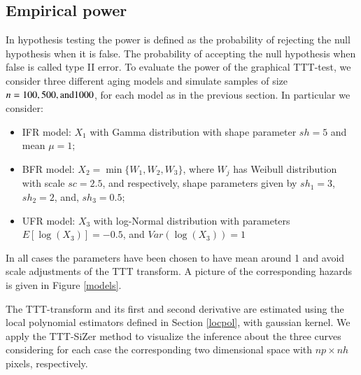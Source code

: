\documentclass[preprint,12pt]{elsarticle}
\begin{document}
\subsection{Empirical power}

In hypothesis testing the power is defined as the probability of rejecting the null hypothesis when it is false. The probability of accepting the null hypothesis when false is called type II error. To evaluate the power of the graphical TTT-test, we consider three  different aging models and  simulate samples of size $n = 100, 500, {\rm and} 1000$, for each model as in the previous section.  In particular we consider:
\begin{itemize}
\item IFR model: $X_1$ with Gamma distribution with shape parameter $sh=5$ and mean $\mu=1$;
\item BFR model: $X_2= \min\{W_1, W_2, W_3\}$, where $W_j$ has Weibull distribution with scale $sc=2.5$, and respectively, shape parameters given by $sh_1=3$, $sh_2=2$, and, $sh_3=0.5$;
\item UFR model: $X_3$ with log-Normal distribution with parameters $E[ \log (X_3)]=-0.5$, and $Var(\log(X_3))=1$
\end{itemize}
In all cases the parameters have been chosen to have mean around 1 and avoid scale adjustments of the TTT transform. A picture of the corresponding hazards is given in Figure \ref{models}.

The TTT-transform and its first and second derivative are estimated using the local polynomial estimators defined in Section \ref{locpol}, with gaussian kernel. We apply the TTT-SiZer method to visualize the inference about the three curves considering for each case the corresponding two dimensional space with $np \times nh$ pixels, respectively.  
\end{document}
